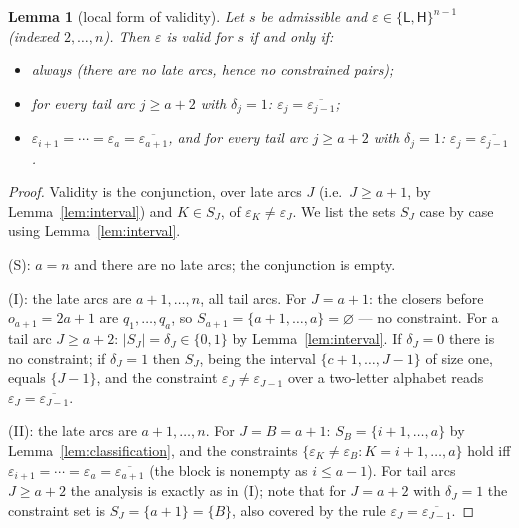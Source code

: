 \documentclass[11pt]{article}
\newtheorem{lemma}[theorem]{Lemma}
\theoremstyle{definition}
\theoremstyle{remark}
\newcommand{\sL}{\mathsf{L}}
\newcommand{\sH}{\mathsf{H}}
\begin{document}
\begin{lemma}[local form of validity]\label{lem:inventory}
Let $s$ be admissible and $\varepsilon\in\{\sL,\sH\}^{n-1}$ (indexed
$2,\dots,n$). Then $\varepsilon$ is valid for $s$ if and only if:
\begin{itemize}
\item[(S)] always (there are no late arcs, hence no constrained pairs);
\item[(I)] for every tail arc $j\ge a+2$ with $\delta_j=1$:
  $\varepsilon_j=\overline{\varepsilon_{j-1}}$;
\item[(II)] $\varepsilon_{i+1}=\cdots=\varepsilon_a
  =\overline{\varepsilon_{a+1}}$, and for every tail arc $j\ge a+2$ with
  $\delta_j=1$: $\varepsilon_j=\overline{\varepsilon_{j-1}}$.
\end{itemize}
\end{lemma}

\begin{proof}
Validity is the conjunction, over late arcs $J$ (i.e.\ $J\ge a+1$, by
Lemma~\ref{lem:interval}) and $K\in S_J$, of
$\varepsilon_K\neq\varepsilon_J$. We list the sets $S_J$ case by case
using Lemma~\ref{lem:interval}.

(S): $a=n$ and there are no late arcs; the conjunction is empty.

(I): the late arcs are $a+1,\dots,n$, all tail arcs. For $J=a+1$: the
closers before $o_{a+1}=2a+1$ are $q_1,\dots,q_a$, so
$S_{a+1}=\{a+1,\dots,a\}=\varnothing$ --- no constraint. For a tail arc
$J\ge a+2$: $|S_J|=\delta_J\in\{0,1\}$ by Lemma~\ref{lem:interval}. If
$\delta_J=0$ there is no constraint; if $\delta_J=1$ then $S_J$, being the
interval $\{c+1,\dots,J-1\}$ of size one, equals $\{J-1\}$, and the
constraint $\varepsilon_J\neq\varepsilon_{J-1}$ over a two-letter alphabet
reads $\varepsilon_J=\overline{\varepsilon_{J-1}}$.

(II): the late arcs are $a+1,\dots,n$. For $J=B=a+1$:
$S_B=\{i+1,\dots,a\}$ by Lemma~\ref{lem:classification}, and the
constraints $\{\varepsilon_K\neq\varepsilon_B: K=i+1,\dots,a\}$ hold iff
$\varepsilon_{i+1}=\cdots=\varepsilon_a=\overline{\varepsilon_{a+1}}$ (the
block is nonempty as $i\le a-1$). For tail arcs $J\ge a+2$ the analysis is
exactly as in (I); note that for $J=a+2$ with $\delta_J=1$ the constraint
set is $S_J=\{a+1\}=\{B\}$, also covered by the rule
$\varepsilon_J=\overline{\varepsilon_{J-1}}$.
\end{proof}
\end{document}
